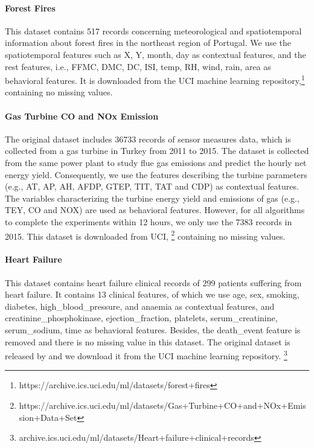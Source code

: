 \documentclass[pdflatex,sn-basic]{sn-jnl}%
\theoremstyle{thmstyleone}%
\theoremstyle{thmstyletwo}%
\theoremstyle{thmstylethree}%
\begin{document}
\begin{appendices}
\paragraph{Forest Fires} This dataset contains 517 records concerning meteorological and spatiotemporal information about forest fires in the northeast region of Portugal. We use the spatiotemporal features such as  X, Y, month, day as contextual features, and the rest features, i.e., FFMC, DMC, DC, ISI, temp, RH, wind, rain, area as behavioral features. It is downloaded from the UCI machine learning repository,\footnote{https://archive.ics.uci.edu/ml/datasets/forest+fires} containing no missing values.

\paragraph{Gas Turbine CO and NOx Emission } The original dataset includes 36733 records of sensor measures data, which is collected from a gas turbine in Turkey from 2011 to 2015. The dataset is collected from the same power plant to study flue gas emissions and predict the hourly net energy yield. Consequently, we use the features describing the turbine parameters (e.g., AT, AP, AH, AFDP, GTEP, TIT, TAT and CDP) as contextual features.
The variables characterizing the turbine energy yield and emissions of gas  (e.g., TEY, CO and NOX) are used as behavioral features. However, for all algorithms to complete the experiments within 12 hours, we only use the 7383 records in 2015. This dataset is downloaded from UCI, \footnote{https://archive.ics.uci.edu/ml/datasets/Gas+Turbine+CO+and+NOx+Emission+Data+Set} containing no missing values.


\paragraph{Heart Failure} 
This dataset contains heart failure clinical records of 299 patients suffering from heart failure. It contains 13 clinical features, of which we use age, sex, smoking, diabetes, high\_blood\_pressure, and anaemia as contextual features, and creatinine\_phosphokinase, ejection\_fraction, platelets, serum\_creatinine, serum\_sodium, time as behavioral features. Besides, the death\_event feature is removed and there is no missing value in this dataset. The original dataset is released by \cite{ahmad2017survival} and we download it from the UCI machine learning repository. \footnote{archive.ics.uci.edu/ml/datasets/Heart+failure+clinical+records}


\end{appendices}
\end{document}
